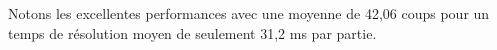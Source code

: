 \begin{center}
\end{center}

Notons les excellentes performances avec une moyenne de 42,06 coups pour un temps de résolution moyen de seulement 31,2 ms par partie.
